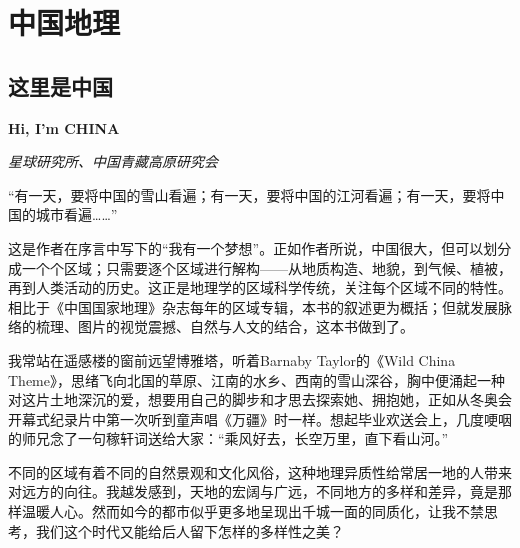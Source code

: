 \section{中国地理}

\subsection*{这里是中国}
\par \textbf{Hi, I’m CHINA}
\par \emph{星球研究所、中国青藏高原研究会} 

\par “有一天，要将中国的雪山看遍；有一天，要将中国的江河看遍；有一天，要将中国的城市看遍……”
\par 这是作者在序言中写下的“我有一个梦想”。正如作者所说，中国很大，但可以划分成一个个区域；只需要逐个区域进行解构——从地质构造、地貌，到气候、植被，再到人类活动的历史。这正是地理学的区域科学传统，关注每个区域不同的特性。相比于《中国国家地理》杂志每年的区域专辑，本书的叙述更为概括；但就发展脉络的梳理、图片的视觉震撼、自然与人文的结合，这本书做到了。

\par 我常站在遥感楼的窗前远望博雅塔，听着Barnaby Taylor的《Wild China Theme》，思绪飞向北国的草原、江南的水乡、西南的雪山深谷，胸中便涌起一种对这片土地深沉的爱，想要用自己的脚步和才思去探索她、拥抱她，正如从冬奥会开幕式纪录片中第一次听到童声唱《万疆》时一样。想起毕业欢送会上，几度哽咽的师兄念了一句稼轩词送给大家：“乘风好去，长空万里，直下看山河。”
\par 不同的区域有着不同的自然景观和文化风俗，这种地理异质性给常居一地的人带来对远方的向往。我越发感到，天地的宏阔与广远，不同地方的多样和差异，竟是那样温暖人心。然而如今的都市似乎更多地呈现出千城一面的同质化，让我不禁思考，我们这个时代又能给后人留下怎样的多样性之美？
\par {}
\par {}


